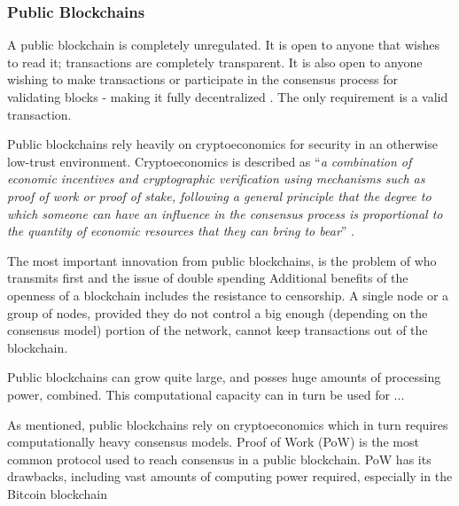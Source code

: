\subsubsection*{Public Blockchains}
A public blockchain is completely unregulated. It is open to anyone that wishes to read it; transactions are completely transparent. It is also open to anyone wishing to make transactions or participate in the consensus process for validating blocks - making it fully decentralized \cite{Ethereum_pub_priv}. The only requirement is a valid transaction. %

Public blockchains rely heavily on cryptoeconomics for security in an otherwise low-trust environment. %
Cryptoeconomics is described as \enquote{\textit{a combination of economic incentives and cryptographic verification using mechanisms such as proof of work or proof of stake, following a general principle that the degree to which someone can have an influence in the consensus process is proportional to the quantity of economic resources that they can bring to bear}} \cite{Ethereum_pub_priv}. 

The most important innovation from public blockchains, is the problem of who transmits first and the issue of double spending %
Additional benefits of the openness of a blockchain includes the resistance to censorship. A single node or a group of nodes, provided they do not control a big enough (depending on the consensus model) portion of the network, cannot keep transactions out of the blockchain. %

Public blockchains can grow quite large, and posses huge amounts of processing power, combined. This computational capacity can in turn be used for ... %

As mentioned, public blockchains rely on cryptoeconomics which in turn requires computationally heavy consensus models. Proof of Work (PoW) is the most common protocol used to reach consensus in a public blockchain. %
PoW has its drawbacks, including vast amounts of computing power required, especially in the Bitcoin blockchain %





